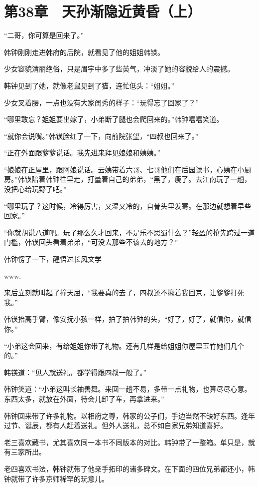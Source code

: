\section{第38章　天孙渐隐近黄昏（上）}

“二哥，你可算是回来了。”

韩钟刚刚走进韩府的后院，就看见了他的姐姐韩锳。

少女容貌清丽绝俗，只是眉宇中多了些英气，冲淡了她的容貌给人的震撼。

韩钟见到了她，就像老鼠见到了猫，连忙低头：“姐姐。”

少女叉着腰，一点也没有大家闺秀的样子：“玩得忘了回家了？”

“哪里敢忘？姐姐要出嫁了，小弟断了腿也会爬回来的。”韩钟嘻嘻笑道。

“就你会说嘴。”韩锳脸红了一下，向前院张望，“四叔也回来了。”

“正在外面跟爹爹说话。我先进来拜见娘娘和姨姨。”

“娘娘在正屋里，跟阿娘说话。云姨带着六哥、七哥他们在后园读书，心姨在小厨房。”韩锳陪着韩钟往里走，打量着自己的弟弟，“黑了，瘦了。去江南玩了一趟，没把心给玩野了吧。”

“哪里玩了？这时候，冷得厉害，又湿又冷的，自骨头里发寒。在那边就想着早些回家。”

“你就胡说八道吧。玩了那么久才回来，不是乐不思蜀什么？”轻盈的抢先跨过一道门槛，韩锳回头看着弟弟，“可没去那些不该去的地方？”

韩钟愣了一下，醒悟过长风文学

www.

来后立刻就叫起了撞天屈，“我要真的去了，四叔还不揪着我回京，让爹爹打死我。”

韩锳抬高手臂，像安抚小孩一样，拍了拍韩钟的头，“好了，好了，就信你，就信你。”

“小弟这会回来，有给姐姐你带了礼物。还有几样是给姐姐你屋里玉竹她们几个的。”

韩锳道：“见人就送礼，都学得跟四叔一般了。”

韩钟笑道：“小弟这叫长袖善舞。来回一趟不易，多带一点礼物，也算尽尽心意。东西太多，就放在外面，待会儿卸了车，再拿进来。”

韩钟回来带了许多礼物。以相府之尊，韩家的公子们，手边当然不缺好东西。逢年过节、诞辰，都有人赶着送礼。但外人送礼，总不如自家兄弟知道喜好。

老三喜欢藏书，尤其喜欢同一本书不同版本的对比。韩钟带了一整箱。单只是，就有三家所出。

老四喜欢书法，韩钟就带了他亲手拓印的诸多碑文。在下面的四位兄弟都还小，韩钟就带了许多京师稀罕的玩意儿。

